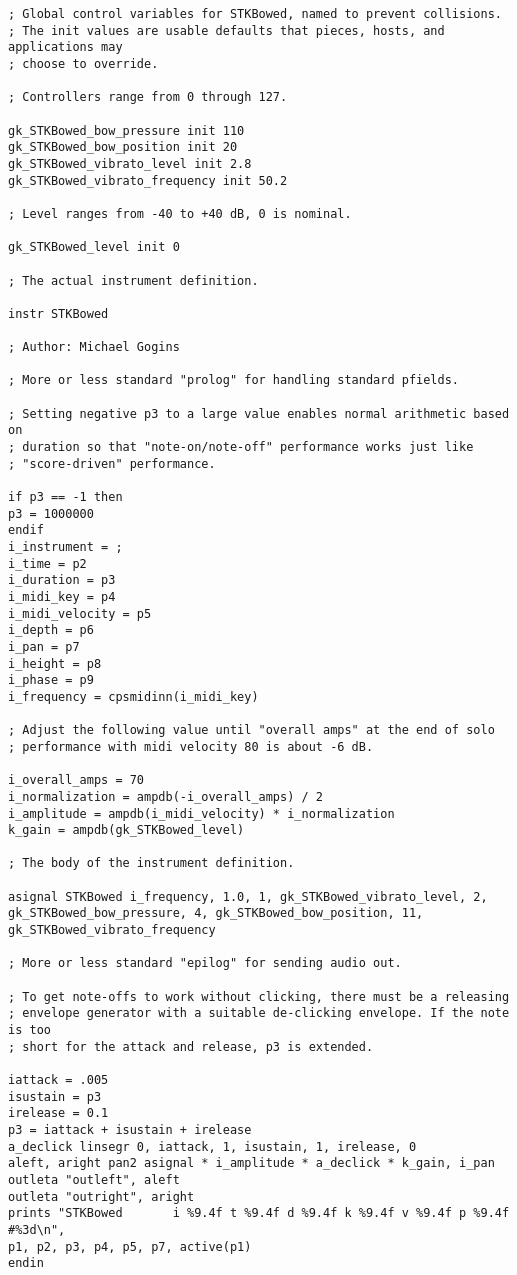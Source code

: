 \documentclass[12pt,letterpaper,onecolumn]{scrartcl}
\begin{document}
\begin{lstlisting}
; Global control variables for STKBowed, named to prevent collisions.
; The init values are usable defaults that pieces, hosts, and applications may
; choose to override.

; Controllers range from 0 through 127.

gk_STKBowed_bow_pressure init 110
gk_STKBowed_bow_position init 20
gk_STKBowed_vibrato_level init 2.8
gk_STKBowed_vibrato_frequency init 50.2

; Level ranges from -40 to +40 dB, 0 is nominal.

gk_STKBowed_level init 0

; The actual instrument definition.

instr STKBowed

; Author: Michael Gogins

; More or less standard "prolog" for handling standard pfields.

; Setting negative p3 to a large value enables normal arithmetic based on
; duration so that "note-on/note-off" performance works just like
; "score-driven" performance.

if p3 == -1 then
p3 = 1000000
endif
i_instrument = ;
i_time = p2
i_duration = p3
i_midi_key = p4
i_midi_velocity = p5
i_depth = p6
i_pan = p7
i_height = p8
i_phase = p9
i_frequency = cpsmidinn(i_midi_key)

; Adjust the following value until "overall amps" at the end of solo
; performance with midi velocity 80 is about -6 dB.

i_overall_amps = 70
i_normalization = ampdb(-i_overall_amps) / 2
i_amplitude = ampdb(i_midi_velocity) * i_normalization
k_gain = ampdb(gk_STKBowed_level)

; The body of the instrument definition.

asignal STKBowed i_frequency, 1.0, 1, gk_STKBowed_vibrato_level, 2, gk_STKBowed_bow_pressure, 4, gk_STKBowed_bow_position, 11, gk_STKBowed_vibrato_frequency

; More or less standard "epilog" for sending audio out.

; To get note-offs to work without clicking, there must be a releasing
; envelope generator with a suitable de-clicking envelope. If the note is too
; short for the attack and release, p3 is extended.

iattack = .005
isustain = p3
irelease = 0.1
p3 = iattack + isustain + irelease
a_declick linsegr 0, iattack, 1, isustain, 1, irelease, 0
aleft, aright pan2 asignal * i_amplitude * a_declick * k_gain, i_pan
outleta "outleft", aleft
outleta "outright", aright
prints "STKBowed       i %9.4f t %9.4f d %9.4f k %9.4f v %9.4f p %9.4f #%3d\n",
p1, p2, p3, p4, p5, p7, active(p1)
endin

\end{lstlisting}
\end{document}
